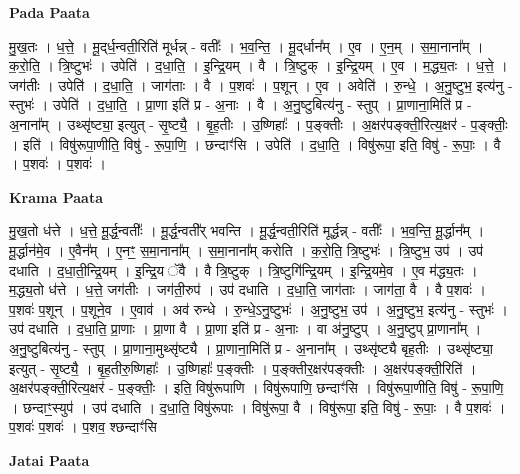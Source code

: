 \documentclass[17pt]{extarticle}
\begin{document}
\textbf{Pada Paata} \newline

मु॒ख॒तः । ध॒त्ते॒ । मू॒द्‌र्ध॒न्वती॒रिति॑ मूर्धन्न् - वतीः᳚ । भ॒व॒न्ति॒ । मू॒द्‌र्धान᳚म् । ए॒व । ए॒न॒म् । स॒मा॒नाना᳚म् । क॒रो॒ति॒ । त्रि॒ष्टुभः॑ । उपेति॑ । द॒धा॒ति॒ । इ॒न्द्रि॒यम् । वै । त्रि॒ष्टुक् । इ॒न्द्रि॒यम् । ए॒व । म॒द्ध्य॒तः । ध॒त्ते॒ । जग॑तीः । उपेति॑ । द॒धा॒ति॒ । जाग॑ताः । वै । प॒शवः॑ । प॒शून् । ए॒व । अवेति॑ । रु॒न्धे॒ । अ॒नु॒ष्टुभ॒ इत्य॑नु - स्तुभः॑ । उपेति॑ । द॒धा॒ति॒ । प्रा॒णा इति॑ प्र - अ॒नाः । वै । अ॒नु॒ष्टुबित्य॑नु - स्तुप् । प्रा॒णाना॒मिति॑ प्र -  अ॒नाना᳚म् । उथ्सृ॑ष्ट्या॒ इत्युत् - सृ॒ष्ट्यै॒ । बृ॒ह॒तीः । उ॒ष्णिहाः᳚ । प॒ङ्क्तीः । अ॒क्षर॑पङ्क्ती॒रित्य॒क्षर॑ - प॒ङ्क्तीः॒ । इति॑ । विषु॑रूपा॒णीति॒ विषु॑ - रू॒पा॒णि॒ । छन्दाꣳ॑सि । उपेति॑ । द॒धा॒ति॒ । विषु॑रूपा॒ इति॒ विषु॑ - रू॒पाः॒ । वै । प॒शवः॑ । प॒शवः॑ ।  \newline


\textbf{Krama Paata} \newline

मु॒ख॒तो ध॑त्ते । ध॒त्ते॒ मू॒र्द्ध॒न्वतीः᳚ । मू॒र्द्ध॒न्वती᳚र् भवन्ति । मू॒र्द्ध॒न्वती॒रिति॑ मूर्द्धन्न् - वतीः᳚ । भ॒व॒न्ति॒ मू॒र्द्धान᳚म् । मू॒र्द्धान॑मे॒व । ए॒वैन᳚म् । ए॒नꣳ॒॒ स॒मा॒नाना᳚म् । स॒मा॒नाना᳚म् करोति । क॒रो॒ति॒ त्रि॒ष्टुभः॑ । त्रि॒ष्टुभ॒ उप॑ । उप॑ दधाति । द॒धा॒ती॒न्द्रि॒यम् । इ॒न्द्रि॒य ॅवै । वै त्रि॒ष्टुक् । त्रि॒ष्टुगि॑न्द्रि॒यम् । इ॒न्द्रि॒यमे॒व । ए॒व म॑द्ध्य॒तः । म॒द्ध्य॒तो ध॑त्ते । ध॒त्ते॒ जग॑तीः । जग॑ती॒रुप॑ । उप॑ दधाति । द॒धा॒ति॒ जाग॑ताः । जाग॑ता॒ वै । वै प॒शवः॑ । प॒शवः॑ प॒शून् । प॒शूने॒व । ए॒वाव॑ । अव॑ रुन्धे । रु॒न्धे॒ऽनु॒ष्टुभः॑ । अ॒नु॒ष्टुभ॒ उप॑ । अ॒नु॒ष्टुभ॒ इत्य॑नु - स्तुभः॑ । उप॑ दधाति । द॒धा॒ति॒ प्रा॒णाः । प्रा॒णा वै । प्रा॒णा इति॑ प्र - अ॒नाः । वा अ॑नु॒ष्टुप् । अ॒नु॒ष्टुप् प्रा॒णाना᳚म् । अ॒नु॒ष्टुबित्य॑नु - स्तुप् । प्रा॒णाना॒मुथ्सृ॑ष्ट्यै । प्रा॒णाना॒मिति॑ प्र - अ॒नाना᳚म् । उथ्सृ॑ष्ट्यै बृह॒तीः । उथ्सृ॑ष्ट्या॒ इत्युत् - सृ॒ष्ट्यै॒ । बृ॒ह॒तीरु॒ष्णिहाः᳚ । उ॒ष्णिहाः᳚ प॒ङ्क्तीः । प॒ङ्क्तीर॒क्षर॑पङ्क्तीः । अ॒क्षर॑पङ्क्ती॒रिति॑ । अ॒क्षर॑पङ्क्ती॒रित्य॒क्षर॑ - प॒ङ्क्तीः॒ । इति॒ विषु॑रूपाणि । विषु॑रूपाणि॒ छन्दाꣳ॑सि । विषु॑रूपा॒णीति॒ विषु॑ - रू॒पा॒णि॒ । छन्दाꣳ॒॒स्युप॑ । उप॑ दधाति । द॒धा॒ति॒ विषु॑रूपाः । विषु॑रूपा॒ वै । विषु॑रूपा॒ इति॒ विषु॑ - रू॒पाः॒ । वै प॒शवः॑ । प॒शवः॑ प॒शवः॑ । प॒शव॒ श्छन्दाꣳ॑सि \newline

\textbf{Jatai Paata} \newline
\end{document}
